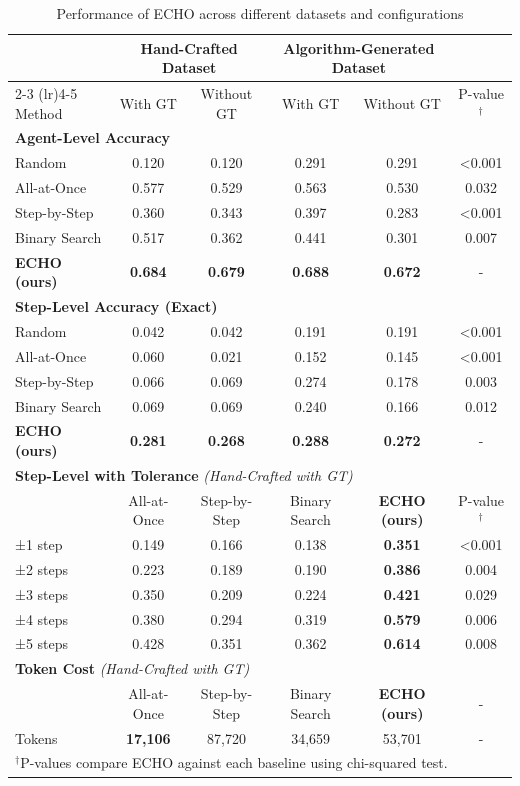 \documentclass{article}
\begin{document}
\begin{table}[t]
\caption{Performance of ECHO across different datasets and configurations}
\label{tab:echo-results}
\centering
\small
\begin{tabular}{lccccc}
\toprule
& \multicolumn{2}{c}{Hand-Crafted Dataset} & \multicolumn{2}{c}{Algorithm-Generated Dataset} & \\
\cmidrule(lr){2-3} \cmidrule(lr){4-5}
Method & With GT & Without GT & With GT & Without GT & P-value$^{\dagger}$ \\
\midrule
\multicolumn{6}{l}{\textbf{Agent-Level Accuracy}} \\
Random & 0.120 & 0.120 & 0.291 & 0.291 & <0.001 \\
All-at-Once & 0.577 & 0.529 & 0.563 & 0.530 & 0.032 \\
Step-by-Step & 0.360 & 0.343 & 0.397 & 0.283 & <0.001 \\
Binary Search & 0.517 & 0.362 & 0.441 & 0.301 & 0.007 \\
\midrule[\heavyrulewidth]
\textbf{ECHO (ours)} & \textbf{0.684} & \textbf{0.679} & \textbf{0.688} & \textbf{0.672} & - \\
\midrule
\multicolumn{6}{l}{\textbf{Step-Level Accuracy (Exact)}} \\
Random & 0.042 & 0.042 & 0.191 & 0.191 & <0.001 \\
All-at-Once & 0.060 & 0.021 & 0.152 & 0.145 & <0.001 \\
Step-by-Step & 0.066 & 0.069 & 0.274 & 0.178 & 0.003 \\
Binary Search & 0.069 & 0.069 & 0.240 & 0.166 & 0.012 \\
\midrule[\heavyrulewidth]
\textbf{ECHO (ours)} & \textbf{0.281} & \textbf{0.268} & \textbf{0.288} & \textbf{0.272} & - \\
\midrule
\multicolumn{6}{l}{\textbf{Step-Level with Tolerance} \textit{(Hand-Crafted with GT)}} \\
& All-at-Once & Step-by-Step & Binary Search & \textbf{ECHO (ours)} & P-value$^{\dagger}$ \\
±1 step & 0.149 & 0.166 & 0.138 & \textbf{0.351} & <0.001 \\
±2 steps & 0.223 & 0.189 & 0.190 & \textbf{0.386} & 0.004 \\
±3 steps & 0.350 & 0.209 & 0.224 & \textbf{0.421} & 0.029 \\
±4 steps & 0.380 & 0.294 & 0.319 & \textbf{0.579} & 0.006 \\
±5 steps & 0.428 & 0.351 & 0.362 & \textbf{0.614} & 0.008 \\
\midrule
\multicolumn{6}{l}{\textbf{Token Cost} \textit{(Hand-Crafted with GT)}} \\
& All-at-Once & Step-by-Step & Binary Search & \textbf{ECHO (ours)} & - \\
Tokens & \textbf{17,106} & 87,720 & 34,659 & 53,701 & - \\
\bottomrule
\multicolumn{6}{l}{$^{\dagger}$P-values compare ECHO against each baseline using chi-squared test.} \\
\end{tabular}
\end{table}
\end{document}

